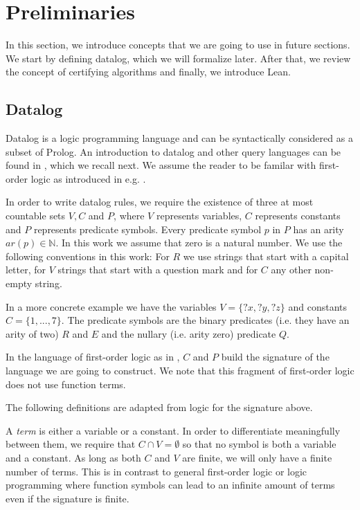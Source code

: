 \section{Preliminaries}\label{sec:prelim}


In this section, we introduce concepts that we are going to use in future sections. We start by defining datalog, which we will formalize later. After that, we review the concept of certifying algorithms and finally, we introduce Lean.


\subsection{Datalog}
Datalog is a logic programming language and can be syntactically considered as a subset of Prolog. An introduction to datalog and other query languages can be found in \cite{alice}, which we recall next. We assume the reader to be familar with first-order logic as introduced in e.g. \cite{logic}.

In order to write datalog rules, we require the existence of three at most countable sets $V, C$ and $P$, where $V$ represents variables, $C$ represents constants and $P$ represents predicate symbols. Every predicate symbol $p$ in $P$ has an arity $ar(p) \in \mathbb{N}$. In this work we assume that zero is a natural number.
We use the following conventions in this work: For $R$ we use strings that start with a capital letter, for $V$ strings that start with a question mark and for $C$ any other non-empty string.

\begin{example}
In a more concrete example we have the variables $V= \{?x,?y,?z\}$ and constants $C= \{1,...,7\}$. The predicate symbols are the binary predicates (i.e. they have an arity of two) $R$ and $E$ and the nullary (i.e. arity zero) predicate $Q$.
\end{example}

In the language of first-order logic as in \cite{logic}, $C$ and $P$ build the signature of the language we are going to construct. We note that this fragment of first-order logic does not use function terms.

The following definitions are adapted from logic for the signature above.

A \textit{term} is either a variable or a constant. In order to differentiate meaningfully between them, we require that $C \cap V = \emptyset$ so that no symbol is both a variable and a constant. As long as both $C$ and $V$ are finite, we will only have a finite number of terms. This is in contrast to general first-order logic or logic programming where function symbols can lead to an infinite amount of terms even if the signature is finite.

